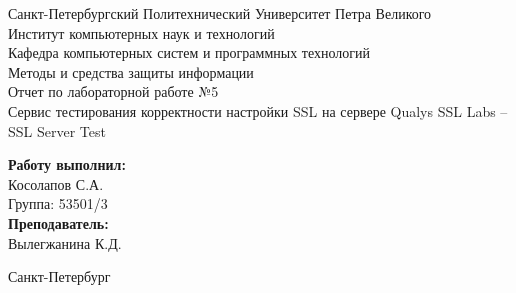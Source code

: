 \documentclass[a4paper]{article}
\begin{document}

\begin{titlepage}	%

	\begin{center}		%

		\large Санкт-Петербургский Политехнический Университет Петра Великого\\
		\large Институт компьютерных наук и технологий \\
		\large Кафедра компьютерных систем и программных технологий\\[6cm]
		
		\huge Методы и средства защиты информации\\[0.5cm] %
		\large Отчет по лабораторной работе №5\\[0.1cm]
		\large Сервис тестирования корректности настройки SSL на сервере Qualys SSL Labs – SSL Server Test\\[5cm]

	\end{center}


	\begin{flushright} %
		\begin{minipage}{0.25\textwidth} %
			\begin{flushleft} %

				\large\textbf{Работу выполнил:}\\
				\large Косолапов С.А.\\
				\large {Группа:} 53501/3\\
				
				\large \textbf{Преподаватель:}\\
				\large Вылегжанина К.Д.

			\end{flushleft}
		\end{minipage}
	\end{flushright}
	
	\vfill %

	\begin{center}
	\large Санкт-Петербург\\
	\large \the\year %
	\end{center} %

\thispagestyle{empty} %
\end{titlepage} %
\end{document}
